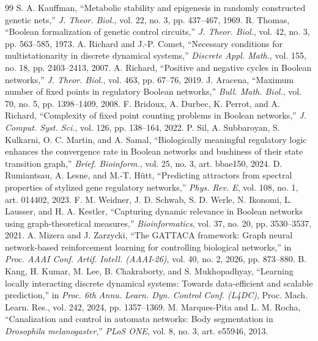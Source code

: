 \documentclass[journal]{IEEEtran}
\begin{document}
\begin{thebibliography}{99}
 S. A. Kauffman, ``Metabolic stability and epigenesis in randomly
constructed genetic nets,'' \emph{J. Theor. Biol.}, vol. 22, no. 3, pp. 437--467, 1969.
 R. Thomas, ``Boolean formalization of genetic control
circuits,'' \emph{J. Theor. Biol.}, vol. 42, no. 3, pp. 563--585, 1973.
 A. Richard and J.-P. Comet, ``Necessary conditions for
multistationarity in discrete dynamical systems,'' \emph{Discrete Appl. Math.}, vol.
155, no. 18, pp. 2403--2413, 2007.
 A. Richard, ``Positive and negative cycles in Boolean networks,''
\emph{J. Theor. Biol.}, vol. 463, pp. 67--76, 2019.
 J. Aracena, ``Maximum number of fixed points in regulatory
Boolean networks,'' \emph{Bull. Math. Biol.}, vol. 70, no. 5, pp. 1398--1409, 2008.
 F. Bridoux, A. Durbec, K. Perrot, and A. Richard, ``Complexity of
fixed point counting problems in Boolean networks,'' \emph{J. Comput. Syst. Sci.}, vol.
126, pp. 138--164, 2022.
 P. Sil, A. Subbaroyan, S. Kulkarni, O. C. Martin, and A. Samal,
``Biologically meaningful regulatory logic enhances the convergence rate in Boolean
networks and bushiness of their state transition graph,'' \emph{Brief. Bioinform.}, vol.
25, no. 3, art. bbae150, 2024.
 D. Rumiantsau, A. Lesne, and M.-T. H\"utt, ``Predicting
attractors from spectral properties of stylized gene regulatory networks,'' \emph{Phys.
Rev. E}, vol. 108, no. 1, art. 014402, 2023.
 F. M. Weidner, J. D. Schwab, S. D. Werle, N. Ikonomi, L. Lausser,
and H. A. Kestler, ``Capturing dynamic relevance in
Boolean networks using graph-theoretical measures,'' \emph{Bioinformatics}, vol. 37, no.
20, pp. 3530--3537, 2021.
 A. Mizera and J. Zarzycki, ``The GATTACA framework: Graph neural
network-based reinforcement learning for controlling biological networks,'' in \emph{Proc.
AAAI Conf. Artif. Intell. (AAAI-26)}, vol. 40, no. 2, 2026, pp. 873--880.
 B. Kang, H. Kumar, M. Lee, B. Chakraborty, and S. Mukhopadhyay,
``Learning locally interacting discrete dynamical systems: Towards data-efficient and
scalable prediction,'' in \emph{Proc. 6th Annu. Learn. Dyn. Control Conf. (L4DC)}, Proc.
Mach. Learn. Res., vol. 242, 2024, pp. 1357--1369.
 M. Marques-Pita and L. M. Rocha, ``Canalization and control in automata
networks: Body segmentation in \emph{Drosophila melanogaster},'' \emph{PLoS ONE}, vol. 8,
no. 3, art. e55946, 2013.

\end{thebibliography}
\end{document}
